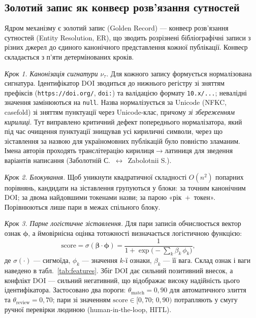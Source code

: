 \subsection*{Золотий запис як конвеєр розв'язання сутностей}

Ядром механізму є золотий запис (Golden Record) — конвеєр розв'язання сутностей (Entity Resolution, ER), що зводить розрізнені бібліографічні записи з різних джерел до єдиного канонічного представлення кожної публікації. Конвеєр складається з п'яти детермінованих кроків.

\emph{Крок 1. Канонізація сигнатури $\nu_\tau$.} Для кожного запису формується нормалізована сигнатура. Ідентифікатор DOI зводиться до нижнього регістру зі зняттям префіксів (\texttt{https://doi.org/}, \texttt{doi:}) та валідацією формату \texttt{10.x/...}; невалідні значення замінюються на \texttt{null}. Назва нормалізується за Unicode (NFKC, casefold) зі зняттям пунктуації через Unicode-клас, причому \emph{зі збереженням кирилиці}. Тут виправлено критичний дефект попереднього нормалізатора, який під час очищення пунктуації знищував усі кириличні символи, через що зіставлення за назвою для україномовних публікацій було повністю зламаним. Імена авторів проходять транслітерацію кирилиця$\rightarrow$латиниця для зведення варіантів написання (Заболотній С.~$\leftrightarrow$~Zabolotnii S.).

\emph{Крок 2. Блокування.} Щоб уникнути квадратичної складності $O(n^2)$ попарних порівнянь, кандидати на зіставлення групуються у блоки: за точним канонічним DOI; за двома найдовшими токенами назви; за парою «рік~$+$~токен». Порівнюються лише пари в межах спільного блоку.

\emph{Крок 3. Парне логістичне зіставлення.} Для пари записів обчислюється вектор ознак $\boldsymbol{\phi}$, а ймовірнісна оцінка тотожності визначається логістичною функцією:
\begin{equation}
\mathrm{score} = \sigma(\boldsymbol{\beta}\cdot\boldsymbol{\phi}) = \frac{1}{1+\exp\!\big(-\sum_{k}\beta_k\,\phi_k\big)},
\end{equation}
де $\sigma(\cdot)$ — сигмоїда, $\phi_k$ — значення $k$-ї ознаки, $\beta_k$ — її вага. Склад ознак і ваги наведено в табл.~\ref{tab:features}. Збіг DOI дає сильний позитивний внесок, а конфлікт DOI — сильний негативний, що відображає високу надійність цього ідентифікатора. Застосовано два пороги: $\theta_{\text{match}}=0{,}90$ для автоматичного злиття та $\theta_{\text{review}}=0{,}70$; пари зі значенням $\mathrm{score}\in[0{,}70;\,0{,}90)$ потрапляють у смугу ручної перевірки людиною (human-in-the-loop, HITL).

